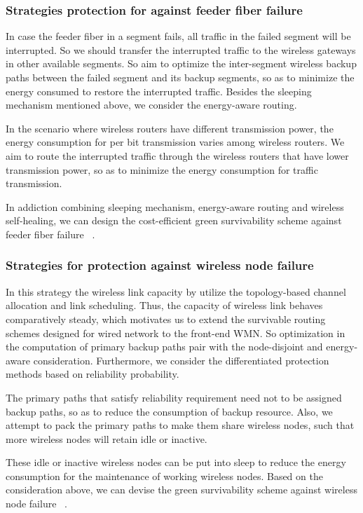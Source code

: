 \documentclass[conference,compsoc]{IEEEtran}
\begin{document}
\subsubsection{Strategies protection for against feeder fiber failure}


In case the feeder fiber in a segment fails, all traffic in the failed segment will be interrupted. So 
we should  transfer the interrupted traffic to the wireless gateways in other available segments.
So aim to optimize the inter-segment wireless backup paths between the failed segment and its backup 
segments, so as to minimize the energy consumed to restore the interrupted traffic. 
Besides the sleeping mechanism mentioned above, we consider the energy-aware routing.

In the scenario where wireless routers have different transmission power, the energy consumption 
for per bit transmission varies among wireless routers. We aim to route the interrupted traffic
through the wireless routers that have lower transmission power, so as to minimize the energy 
consumption for traffic transmission.

In addiction combining sleeping mechanism, energy-aware routing and wireless self-healing, we can design 
the cost-efficient green survivability scheme against feeder fiber failure ~\cite{Liu201268}.

\subsubsection{Strategies for protection against wireless node failure}


In this strategy the  wireless link capacity by utilize the topology-based channel allocation and 
link scheduling. 
Thus, the capacity of wireless link behaves comparatively steady, which motivates us to extend the 
survivable routing schemes designed for wired network to the front-end WMN. So optimization in the 
computation of primary  backup paths pair with the node-disjoint  and energy-aware consideration. 
Furthermore, we consider the differentiated protection methods based on reliability probability.

The primary paths that satisfy reliability requirement need not to be assigned backup paths, so as 
to reduce the consumption of backup resource. Also, we attempt to pack the primary paths to make 
them share wireless nodes, such that more wireless nodes will retain idle or inactive.

These idle or inactive wireless nodes can be put into sleep to reduce the energy consumption for the 
maintenance of working wireless nodes.  Based on the consideration above, we can devise the green 
survivability scheme against wireless node failure ~\cite{Liu201268}.
\end{document}
